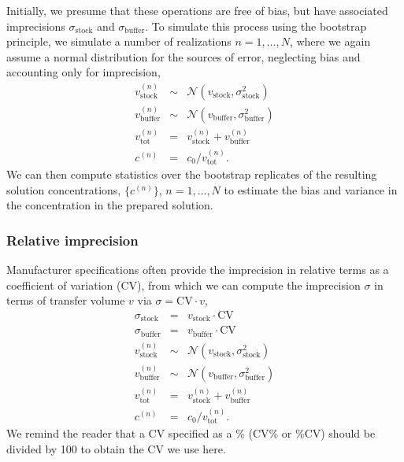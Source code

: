\documentclass[aps,pre,twocolumn,nofootinbib,superscriptaddress,linenumbers]{revtex4-1}
\begin{document}
Initially, we presume that these operations are free of bias, but have associated imprecisions $\sigma_\mathrm{stock}$ and $\sigma_\mathrm{buffer}$. 
To simulate this process using the bootstrap principle, we simulate a number of realizations $n = 1, \ldots, N$, where we again assume a normal distribution for the sources of error, neglecting bias and accounting only for imprecision,
\begin{eqnarray}
v_\mathrm{stock}^{(n)} &\sim& \mathcal{N}(v_\mathrm{stock}, \sigma_\mathrm{stock}^2) \nonumber \\
v_\mathrm{buffer}^{(n)} &\sim& \mathcal{N}(v_\mathrm{buffer}, \sigma_\mathrm{buffer}^2) \nonumber \\
v_\mathrm{tot}^{(n)} &=& v_\mathrm{stock}^{(n)} + v_\mathrm{buffer}^{(n)} \nonumber \\
c^{(n)} &=& c_0 / v_\mathrm{tot}^{(n)} .
\end{eqnarray}
We can then compute statistics over the bootstrap replicates of the resulting solution concentrations, $\{c^{(n)}\}$, $n = 1,\ldots,N$ to estimate the bias and variance in the concentration in the prepared solution.

\subsubsection*{Relative imprecision}

Manufacturer specifications often provide the imprecision in relative terms as a coefficient of variation (CV), from which we can compute the imprecision $\sigma$ in terms of transfer volume $v$ via $\sigma = \mathrm{CV} \cdot v$,
\begin{eqnarray}
\sigma_\mathrm{stock} &=& v_\mathrm{stock} \cdot \mathrm{CV} \nonumber \\
\sigma_\mathrm{buffer} &=& v_\mathrm{buffer} \cdot \mathrm{CV} \nonumber \\
v_\mathrm{stock}^{(n)} &\sim& \mathcal{N}(v_\mathrm{stock} , \sigma_\mathrm{stock}^2) \nonumber \\
v_\mathrm{buffer}^{(n)} &\sim& \mathcal{N}(v_\mathrm{buffer}, \sigma_\mathrm{buffer}^2) \nonumber \\
v_\mathrm{tot}^{(n)} &=& v_\mathrm{stock}^{(n)} + v_\mathrm{buffer}^{(n)} \nonumber \\
c^{(n)} &=& c_0 / v_\mathrm{tot}^{(n)} .
\end{eqnarray}
We remind the reader that a CV specified as a \% (CV\% or \%CV) should be divided by 100 to obtain the CV we use here.
\end{document}
